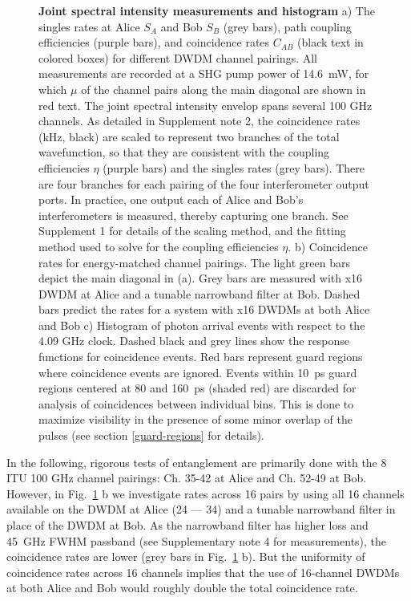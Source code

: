 \documentclass[11pt]{caltech_thesis} %
\begin{document}
{\begin{figure}
\caption[{Joint spectral intensity measurements and histogram}]{\textbf{Joint spectral intensity measurements and histogram} a) The singles rates at Alice $S_A$ and Bob $S_B$ (grey bars), path coupling efficiencies (purple bars), and coincidence rates $C_{AB}$ (black text in colored boxes) for different DWDM channel pairings. All measurements are recorded at a SHG pump power of 14.6~mW, for which $\mu$ of the channel pairs along the main diagonal are shown in red text. The joint spectral intensity envelop spans several 100 GHz channels. As detailed in Supplement note 2, the coincidence rates (kHz, black) are scaled to represent two branches of the total wavefunction, so that they are consistent with the coupling efficiencies $\eta$ (purple bars) and the singles rates (grey bars). There are four branches for each pairing of the four interferometer output ports. In practice, one output each of Alice and Bob's interferometers is measured, thereby capturing one branch. See Supplement 1 for details of the scaling method, and the fitting method used to solve for the coupling efficiencies $\eta$. b) Coincidence rates for energy-matched channel pairings. The light green bars depict the main diagonal in (a). Grey bars are measured with x16 DWDM at Alice and a tunable narrowband filter at Bob. Dashed bars predict the rates for a system with x16 DWDMs at both Alice and Bob c) Histogram of photon arrival events with respect to the 4.09 GHz clock. Dashed black and grey lines show the response functions for coincidence events. Red bars represent guard regions where coincidence events are ignored. Events within 10~ps guard regions centered at 80 and 160~ps (shaded red) are discarded for analysis of coincidences between individual bins. This is done to maximize visibility in the presence of some minor overlap of the pulses (see section \ref{guard-regions} for details).}
\label{fig:figure_2nd_1}
\end{figure}
}

In the following, rigorous tests of entanglement are primarily done with the 8 ITU 100 GHz channel pairings: Ch. 35-42 at Alice and Ch. 52-49 at Bob. However, in Fig.~\ref{fig:figure_2nd_1} b we investigate rates across 16 pairs by using all 16 channels available on the DWDM at Alice (24 --- 34) and a tunable narrowband filter in place of the DWDM at Bob. As the narrowband filter has higher loss and 45~GHz FWHM passband (see Supplementary note 4 for measurements), the coincidence rates are lower (grey bars in Fig.~\ref{fig:figure_2nd_1} b). But the uniformity of coincidence rates across 16 channels implies that the use of 16-channel DWDMs at both Alice and Bob would roughly double the total coincidence rate.
\end{document}

